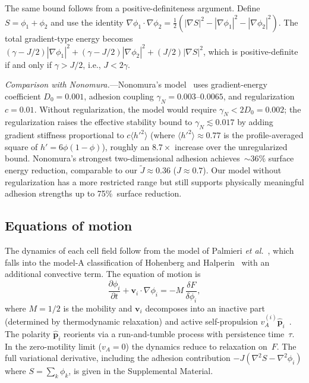 \documentclass[aps,pre,twocolumn,superscriptaddress,longbibliography,floatfix]{revtex4-2}
\newcommand{\vA}{v_{\!A}}                  %
\newcommand{\Jt}{\tilde{J}}               %
\newcommand{\phii}{\phi_i}                 %
\begin{document}
The same bound follows from a positive-definiteness argument.
Define $S = \phi_1 + \phi_2$ and use the identity
$\nabla\phi_1\!\cdot\!\nabla\phi_2 = \tfrac{1}{2}(|\nabla S|^2
- |\nabla\phi_1|^2 - |\nabla\phi_2|^2)$.  The total gradient-type
energy becomes
$(\gamma - J/2)|\nabla\phi_1|^2 + (\gamma - J/2)|\nabla\phi_2|^2
+ (J/2)|\nabla S|^2$,
which is positive-definite if and only if $\gamma > J/2$, i.e.,
$J < 2\gamma$.

\textit{Comparison with Nonomura.}---Nonomura's
model~\cite{Nonomura2012} uses gradient-energy coefficient
$D_0 = 0.001$, adhesion coupling $\gamma_N = 0.003$--$0.0065$, and
regularization $c = 0.01$.  Without regularization, the model would
require $\gamma_N < 2D_0 = 0.002$; the regularization raises
the effective stability bound to $\gamma_N \lesssim 0.017$ by
adding gradient stiffness proportional to $c\langle h'^2\rangle$
(where $\langle h'^2\rangle \approx 0.77$ is the profile-averaged
square of $h' = 6\phi(1-\phi)$), roughly an $8.7\times$ increase
over the unregularized bound.  Nonomura's strongest
two-dimensional adhesion achieves~${\sim}36\%$ surface energy reduction,
comparable to our $\Jt \approx 0.36$ ($J \approx 0.7$).  Our model
without regularization has a more restricted range but still supports
physically meaningful adhesion strengths up to 75\%\ surface reduction.

\subsection{Equations of motion}
\label{sec:model:eom}

The dynamics of each cell field follow from the model of Palmieri
\textit{et al.}~\cite{Palmieri2015}, which falls into the model-A
classification of Hohenberg and Halperin~\cite{HohenbergHalperin1977}
with an additional convective term.  The equation of motion is
%
\begin{equation}
  \frac{\partial \phii}{\partial t}
    + \bm{v}_i \cdot \nabla\phii
    = -M\,\frac{\delta F}{\delta \phii},
  \label{eq:eom}
\end{equation}
%
where $M = 1/2$ is the mobility and $\bm{v}_i$ decomposes into an
inactive part (determined by thermodynamic relaxation) and active
self-propulsion $\vA^{(i)}\hat{\bm{p}}_i$~\cite{Palmieri2015}.
The polarity $\hat{\bm{p}}_i$ reorients via a run-and-tumble
process with persistence time~$\tau$.  In the zero-motility limit
($\vA = 0$) the dynamics reduce to relaxation on~$F$.
The full variational derivative, including the adhesion
contribution $-J(\nabla^2 S - \nabla^2\phii)$ where
$S = \sum_k\phi_k$, is given in the Supplemental Material.
\end{document}
